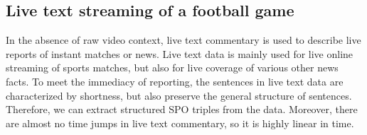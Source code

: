 \documentclass[review,journal]{vgtc}         %
\begin{document}
\subsection{Live text streaming of a football game}
In the absence of raw video context, live text commentary is used to describe live reports of instant matches or news. Live text data is mainly used for live online streaming of sports matches, but also for live coverage of various other news facts. To meet the immediacy of reporting, the sentences in live text data are characterized by shortness, but also preserve the general structure of sentences. Therefore, we can extract structured SPO triples from the data. Moreover, there are almost no time jumps in live text commentary, so it is highly linear in time.
\end{document}

